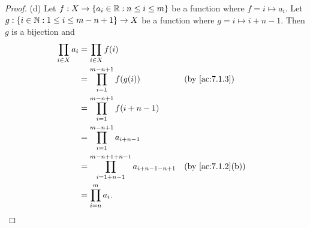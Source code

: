 \begin{proof}{(d)}
  Let \(f : X \to \{a_i \in \mathbb{R} : n \leq i \leq m\}\) be a function where \(f = i \mapsto a_i\).
  Let \(g : \{i \in \mathbb{N} : 1 \leq i \leq m - n + 1\} \to X\) be a function where \(g = i \mapsto i + n - 1\).
  Then \(g\) is a bijection and
  \begin{align*}
    \prod_{i \in X} a_i & = \prod_{i \in X} f(i)                                                                                \\
                        & = \prod_{i = 1}^{m - n + 1} f(g(i))                               &  & \text{(by \cref{ac:7.1.3})}    \\
                        & = \prod_{i = 1}^{m - n + 1} f(i + n - 1)                                                              \\
                        & = \prod_{i = 1}^{m - n + 1} a_{i + n - 1}                                                             \\
                        & = \prod_{i = 1 + n - 1}^{m - n + 1 + n - 1} a_{i + n - 1 - n + 1} &  & \text{(by \cref{ac:7.1.2}(b))} \\
                        & = \prod_{i = n}^m a_i.
  \end{align*}
\end{proof}

